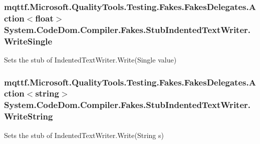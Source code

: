 \hypertarget{class_system_1_1_code_dom_1_1_compiler_1_1_fakes_1_1_stub_indented_text_writer_ae51a9acb39d1763b618691c704fc5d28}{
\subsubsection[{Write\-Single}]{\setlength{\rightskip}{0pt plus 5cm}mqttf.\-Microsoft.\-Quality\-Tools.\-Testing.\-Fakes.\-Fakes\-Delegates.\-Action$<$float$>$ System.\-Code\-Dom.\-Compiler.\-Fakes.\-Stub\-Indented\-Text\-Writer.\-Write\-Single}}\label{class_system_1_1_code_dom_1_1_compiler_1_1_fakes_1_1_stub_indented_text_writer_ae51a9acb39d1763b618691c704fc5d28}


Sets the stub of Indented\-Text\-Writer.\-Write(\-Single value)

\hypertarget{class_system_1_1_code_dom_1_1_compiler_1_1_fakes_1_1_stub_indented_text_writer_a0a83f3f38d95f6e5922146ade37f648e}{
\subsubsection[{Write\-String}]{\setlength{\rightskip}{0pt plus 5cm}mqttf.\-Microsoft.\-Quality\-Tools.\-Testing.\-Fakes.\-Fakes\-Delegates.\-Action$<$string$>$ System.\-Code\-Dom.\-Compiler.\-Fakes.\-Stub\-Indented\-Text\-Writer.\-Write\-String}}\label{class_system_1_1_code_dom_1_1_compiler_1_1_fakes_1_1_stub_indented_text_writer_a0a83f3f38d95f6e5922146ade37f648e}


Sets the stub of Indented\-Text\-Writer.\-Write(\-String s)

